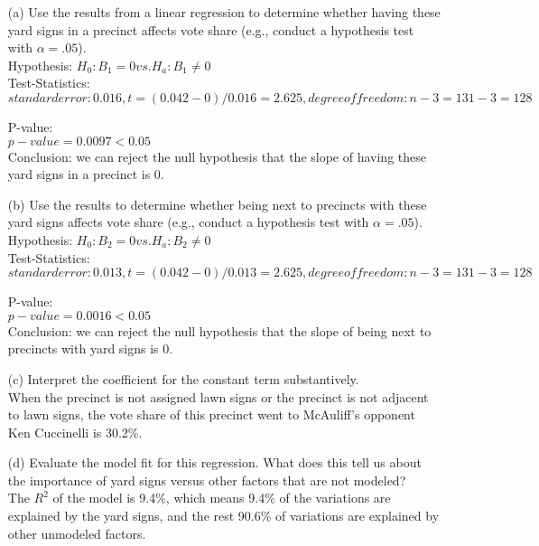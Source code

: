 \documentclass[12pt,letterpaper]{article}
\begin{document}
\vspace{.5cm}
\begin{enumerate}
	\item [(a)] Use the results from a linear regression to determine whether having these yard signs in a precinct affects vote share (e.g., conduct a hypothesis test with $\alpha = .05$).\\
	Hypothesis: $ H_{0}: B_{1} = 0  vs.  H_{a}: B_{1} \not = 0 $\\		
	Test-Statistics: \\
	$ standard error: 0.016, t = (0.042-0) /0.016 = 2.625, degree  of freedom: n - 3 = 131-3 = 128$
		
	P-value:\\
	  
	 $p-value = 0.0097 < 0.05$\\
	 Conclusion: we can reject the null hypothesis that the slope of having these yard signs in a precinct is 0. 
	
	
	\newpage		
	\item [(b)]  Use the results to determine whether being
	next to precincts with these yard signs affects vote
	share (e.g., conduct a hypothesis test with $\alpha = .05$).\\
		Hypothesis: $ H_{0}: B_{2} = 0  vs.  H_{a}: B_{2} \not = 0 $\\		
	Test-Statistics: \\
	$ standard error: 0.013, t = (0.042-0) /0.013 = 2.625, degree  of freedom: n - 3 = 131-3 = 128$
	
	P-value:\\
	 
	$p-value = 0.0016 < 0.05$\\
	Conclusion: we can reject the null hypothesis that the slope of being next to precincts with yard signs is 0. 
	
	
	\vspace{7cm}
	\item [(c)] Interpret the coefficient for the constant term substantively.\\
	When the precinct is not assigned lawn signs or the precinct is not  adjacent to lawn signs, the vote share of this precinct went to McAuliff's opponent Ken Cuccinelli is 30.2\%. 
		\vspace{7cm}
		
	\item [(d)] Evaluate the model fit for this regression.  What does this	tell us about the importance of yard signs versus other factors that are not modeled?\\
	The $R^2$ of the model is 9.4\%, which means 9.4\% of the variations are explained by the yard signs, and the rest 90.6\% of variations are explained by other unmodeled factors. 
	
\end{enumerate}  
\end{document}
